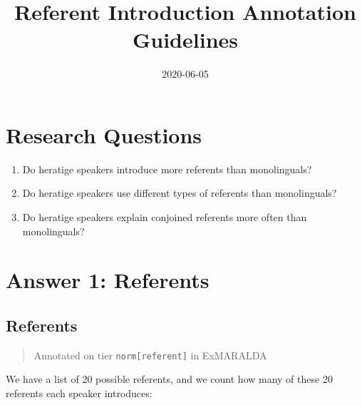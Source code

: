 \documentclass[
]{book}
\title{Referent Introduction Annotation Guidelines}
\author{}
\date{\vspace{-2.5em}2020-06-05}
\begin{document}
\maketitle

{
\setcounter{tocdepth}{1}
\tableofcontents
}
\hypertarget{research-questions}{%
\chapter{Research Questions}\label{research-questions}}

\begin{enumerate}
\def\labelenumi{\arabic{enumi}.}
\item
  Do heratige speakers introduce more referents than monolinguals?
\item
  Do heratige speakers use different types of referents than monolinguals?
\item
  Do heratige speakers explain conjoined referents more often than monolinguals?
\end{enumerate}

\hypertarget{answer-1-referents}{%
\chapter{Answer 1: Referents}\label{answer-1-referents}}

\hypertarget{referents}{%
\section{Referents}\label{referents}}

\begin{quote}
Annotated on tier \texttt{norm{[}referent{]}} in ExMARALDA
\end{quote}

We have a list of 20 possible referents, and we count how many of these 20 referents each speaker introduces:
\end{document}
